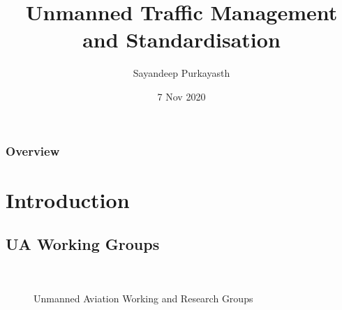 \documentclass[usenames,dvipsnames,aspectratio=169,serif]{beamer}
\title[UTM \& Stdn.]{Unmanned Traffic Management and Standardisation} %
\author{Sayandeep Purkayasth} %
\institute[UAWGs] %
{
\href{mailto:sayandeep@deepcyan.ai}{sayandeep@deepcyan.ai}  \\ %
\medskip
Unmanned Aviation Working Groups
\footnote{\tiny URL: https://groups.google.com/forum/\#!forum/utm-wg} %
\footnote{\tiny Email List: utm-wg@googlegroups.com} %
}
\date{7 Nov 2020} %
\begin{document}
\begin{frame}
\titlepage %
\end{frame}

\begin{frame}
\frametitle{Overview} %
\tableofcontents %
\end{frame}


\section{Introduction} %

\subsection{UA Working Groups} %

\begin{frame}
\frametitle{}

\begin{figure}[tbh]
\begin{centering}
\begin{center}
\small\tt
\hfil 
{}
\hfil \end{center}
\par\end{centering}
\caption{Unmanned Aviation Working and Research Groups}
\end{figure}

\end{frame}
\end{document}
